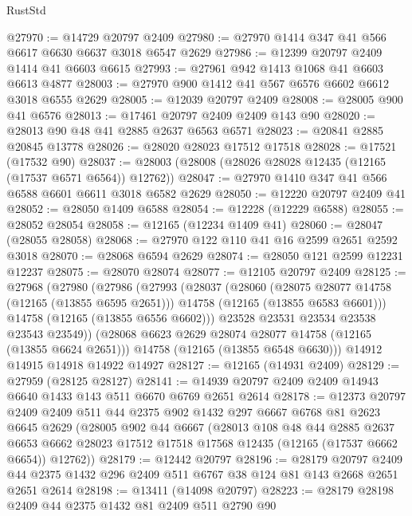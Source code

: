 \begin{lexlean}{RustStd}
\begin{coremodule}
@27970 := @14729 @20797 @2409
@27980 := @27970 @1414 @347 @41 @566 @6617 @6630 @6637 @3018 @6547 @2629
@27986 := @12399 @20797 @2409 @1414 @41 @6603 @6615
@27993 := @27961 @942 @1413 @1068 @41 @6603 @6613 @4877
@28003 := @27970 @900 @1412 @41 @567 @6576 @6602 @6612 @3018 @6555 @2629
@28005 := @12039 @20797 @2409
@28008 := @28005 @900 @41 @6576
@28013 := @17461 @20797 @2409 @2409 @143 @90
@28020 := @28013 @90 @48 @41 @2885 @2637 @6563 @6571
@28023 := @20841 @2885 @20845 @13778
@28026 := @28020 @28023 @17512 @17518
@28028 := @17521 (@17532 @90)
@28037 := @28003 (@28008 (@28026 @28028 @12435 (@12165 (@17537 @6571 @6564)) @12762))
@28047 := @27970 @1410 @347 @41 @566 @6588 @6601 @6611 @3018 @6582 @2629
@28050 := @12220 @20797 @2409 @41
@28052 := @28050 @1409 @6588
@28054 := @12228 (@12229 @6588)
@28055 := @28052 @28054
@28058 := @12165 (@12234 @1409 @41)
@28060 := @28047 (@28055 @28058)
@28068 := @27970 @122 @110 @41 @16 @2599 @2651 @2592 @3018
@28070 := @28068 @6594 @2629
@28074 := @28050 @121 @2599 @12231 @12237
@28075 := @28070 @28074
@28077 := @12105 @20797 @2409
@28125 := @27968
    (@27980
      (@27986
        (@27993
          (@28037
            (@28060
              (@28075 @28077 @14758 (@12165 (@13855 @6595 @2651)))
              @14758
              (@12165 (@13855 @6583 @6601)))
            @14758
            (@12165 (@13855 @6556 @6602)))
          @23528
          @23531
          @23534
          @23538
          @23543
          @23549))
      (@28068 @6623 @2629 @28074 @28077 @14758 (@12165 (@13855 @6624 @2651)))
      @14758
      (@12165 (@13855 @6548 @6630)))
    @14912
    @14915
    @14918
    @14922
    @14927
@28127 := @12165 (@14931 @2409)
@28129 := @27959 (@28125 @28127)
@28141 := @14939 @20797 @2409 @2409 @14943 @6640 @1433 @143 @511 @6670 @6769 @2651 @2614
@28178 := @12373
    @20797
    @2409
    @2409
    @511
    @44
    @2375
    @902
    @1432
    @297
    @6667
    @6768
    @81
    @2623
    @6645
    @2629
    (@28005
      @902
      @44
      @6667
      (@28013
        @108
        @48
        @44
        @2885
        @2637
        @6653
        @6662
        @28023
        @17512
        @17518
        @17568
        @12435
        (@12165 (@17537 @6662 @6654))
        @12762))
@28179 := @12442 @20797
@28196 := @28179
    @20797
    @2409
    @44
    @2375
    @1432
    @296
    @2409
    @511
    @6767
    @38
    @124
    @81
    @143
    @2668
    @2651
    @2651
    @2614
@28198 := @13411 (@14098 @20797)
@28223 := @28179
    @28198
    @2409
    @44
    @2375
    @1432
    @81
    @2409
    @511
    @2790
    @90

\end{coremodule}
\end{lexlean}
